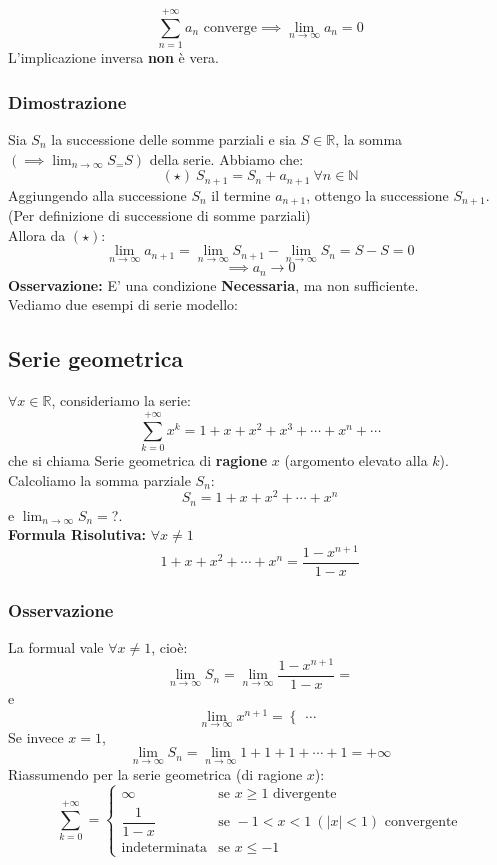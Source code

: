 \documentclass[../../main.tex]{subfiles}
\begin{document}
\[
    \sum_{n=1}^{+\infty}a_n \text{ converge} \implies \lim_{n\to\infty}a_n = 0
\]
L'implicazione inversa \textbf{non} è vera.

\subsubsection{Dimostrazione}

Sia $S_n$ la successione delle somme parziali e sia $S\in \mathbb{R}$, la somma
$(\implies \lim_{n\to\infty}S_ = S)$ della serie. Abbiamo che:
\[
    (\star) \ S_{n+1} = S_n + a_{n+1} \ \forall n\in\mathbb{N}
\]
Aggiungendo alla successione $S_n$ il termine $a_{n+1}$, ottengo la successione
$S_{n+1}$. (Per definizione di successione di somme parziali)\\ Allora da
$(\star)$:
\[
    \lim_{n\to\infty}a_{n+1} = \lim_{n\to\infty}S_{n+1} - \lim_{n\to\infty}S_n = S - S = 0
\]
\[
    \implies a_n\to 0
\]
\textbf{Osservazione:}
E' una condizione \textbf{Necessaria}, ma non sufficiente.\\
Vediamo due esempi di serie modello:

\subsection{Serie geometrica}
$\forall x\in \mathbb{R}$, consideriamo la serie:
\[
    \sum_{k=0}^{+\infty} x^k = 1+ x + x^2 + x^3 + \cdots + x^n + \cdots
\]
che si chiama Serie geometrica di \textbf{ragione} $x$ (argomento elevato alla
$k$).\\ Calcoliamo la somma parziale $S_n$:
\[
    S_n = 1 + x + x^2 + \cdots + x^n
\]
e $\lim_{n\to\infty} S_n =$?.\\ \vspace{1pt} \textbf{Formula Risolutiva:}
$\forall x \ne 1$ \[
    1+x+x^2+\cdots+x^n = \dfrac{1-x^{n+1}}{1-x}
\]

\subsubsection{Osservazione}
La formual vale $\forall x \ne 1$, cioè:
\[
    \lim_{n\to\infty}S_n = \lim_{n\to\infty}\dfrac{1-x^{n+1}}{1-x} =
\]
e
\[
    \lim_{n\to\infty}x^{n+1} = \begin{cases}

        \dots
    \end{cases}
\]
Se invece $x = 1$,
\[
    \lim_{n\to\infty}S_n = \lim_{n\to\infty}1+1+1+\cdots+1 = +\infty
\]
Riassumendo per la serie geometrica (di ragione $x$):
\[
    \sum_{k=0}^{+\infty} = \begin{cases}
        \infty               & \text{se } x \geq 1 \text{ divergente}             \\
        \dfrac{1}{1-x}       & \text{se } -1 < x < 1\ (|x|<1) \text{ convergente} \\
        \text{indeterminata} & \text{se } x \leq -1
    \end{cases}
\]
\end{document}
